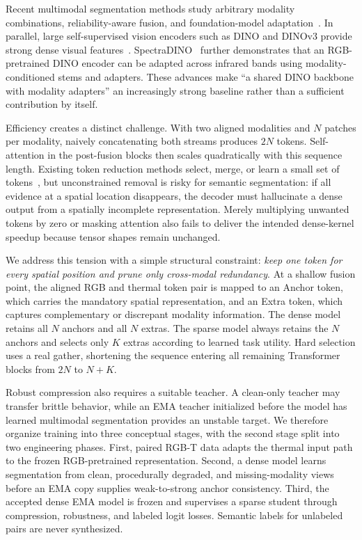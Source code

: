 \documentclass[10pt,twocolumn,letterpaper]{article}
\begin{document}
Recent multimodal segmentation methods study arbitrary modality combinations, reliability-aware fusion, and foundation-model adaptation~\cite{zhang2023deliver,li2024stitchfusion,xu2026rsgmamba,tan2026rtfdnet,zhang2026crossweaver}.
In parallel, large self-supervised vision encoders such as DINO and DINOv3 provide strong dense visual features~\cite{caron2021dino,simeoni2025dinov3}.
SpectraDINO~\cite{nalcakan2026spectradino} further demonstrates that an RGB-pretrained DINO encoder can be adapted across infrared bands using modality-conditioned stems and adapters.
These advances make ``a shared DINO backbone with modality adapters'' an increasingly strong baseline rather than a sufficient contribution by itself.

Efficiency creates a distinct challenge.
With two aligned modalities and $N$ patches per modality, naively concatenating both streams produces $2N$ tokens.
Self-attention in the post-fusion blocks then scales quadratically with this sequence length.
Existing token reduction methods select, merge, or learn a small set of tokens~\cite{rao2021dynamicvit,ryoo2021tokenlearner,bolya2023tome}, but unconstrained removal is risky for semantic segmentation: if all evidence at a spatial location disappears, the decoder must hallucinate a dense output from a spatially incomplete representation.
Merely multiplying unwanted tokens by zero or masking attention also fails to deliver the intended dense-kernel speedup because tensor shapes remain unchanged.

We address this tension with a simple structural constraint: \emph{keep one token for every spatial position and prune only cross-modal redundancy}.
At a shallow fusion point, the aligned RGB and thermal token pair is mapped to an Anchor token, which carries the mandatory spatial representation, and an Extra token, which captures complementary or discrepant modality information.
The dense model retains all $N$ anchors and all $N$ extras.
The sparse model always retains the $N$ anchors and selects only $K$ extras according to learned task utility.
Hard selection uses a real gather, shortening the sequence entering all remaining Transformer blocks from $2N$ to $N+K$.

Robust compression also requires a suitable teacher.
A clean-only teacher may transfer brittle behavior, while an EMA teacher initialized before the model has learned multimodal segmentation provides an unstable target.
We therefore organize training into three conceptual stages, with the second stage split into two engineering phases.
First, paired RGB-T data adapts the thermal input path to the frozen RGB-pretrained representation.
Second, a dense model learns segmentation from clean, procedurally degraded, and missing-modality views before an EMA copy supplies weak-to-strong anchor consistency.
Third, the accepted dense EMA model is frozen and supervises a sparse student through compression, robustness, and labeled logit losses.
Semantic labels for unlabeled pairs are never synthesized.
\end{document}
